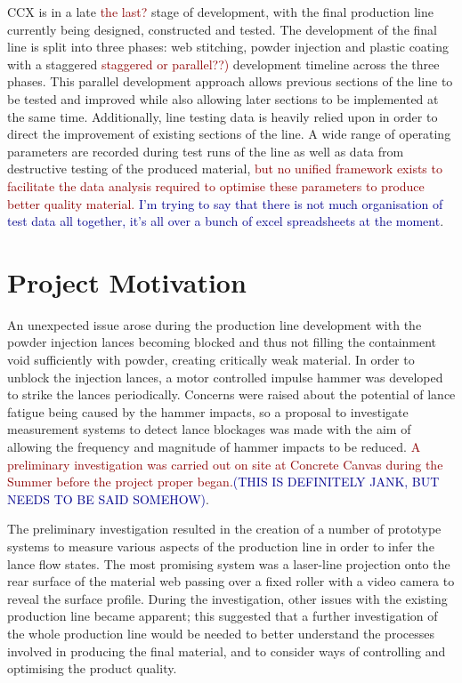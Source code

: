 \documentclass[12pt]{report}
\newcommand{\tcr}[1]{\textcolor{darkRed}{#1}}
\newcommand{\tcb}[1]{\textcolor{darkBlue}{#1}}
\begin{document}
    CCX is in a late \tcr{the last?} stage of development, with the final production line currently being designed, constructed and tested. The development of the final line is split into three phases: web stitching, powder injection and plastic coating with a staggered \tcr{staggered or parallel??)} development timeline across the three phases. This parallel development approach allows previous sections of the line to be tested and improved while also allowing later sections to be implemented at the same time. Additionally, line testing data is heavily relied upon in order to direct the improvement of existing sections of the line. A wide range of operating parameters are recorded during test runs of the line as well as data from destructive testing of the produced material, \tcr{but no unified framework exists to facilitate the data analysis required to optimise these parameters to produce better quality material.} \tcb{I'm trying to say that there is not much organisation of test data all together, it's all over a bunch of excel spreadsheets at the moment}. 
    
    \section{Project Motivation}
        An unexpected issue arose during the production line development with the powder injection lances becoming blocked and thus not filling the containment void sufficiently with powder, creating critically weak material. In order to unblock the injection lances, a motor controlled impulse hammer was developed to strike the lances periodically. Concerns were raised about the potential of lance fatigue being caused by the hammer impacts, so a proposal to investigate measurement systems to detect lance blockages was made with the aim of allowing the frequency and magnitude of hammer impacts to be reduced. \tcr{A preliminary investigation was carried out on site at Concrete Canvas during the Summer before the project proper began.}\tcb{(THIS IS DEFINITELY JANK, BUT NEEDS TO BE SAID SOMEHOW)}.
        
        The preliminary investigation resulted in the creation of a number of prototype systems to measure various aspects of the production line in order to infer the lance flow states. The most promising system was a laser-line projection onto the rear surface of the material web passing over a fixed roller with a video camera to reveal the surface profile. During the investigation, other issues with the existing production line became apparent; this suggested that a further investigation of the whole production line would be needed to better understand the processes involved in producing the final material, and to consider ways of controlling and optimising the product quality. 
        
\end{document}
